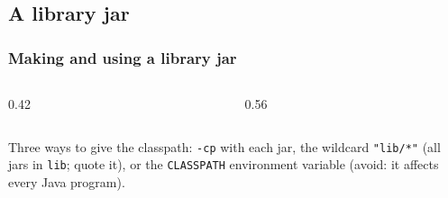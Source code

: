 \documentclass[aspectratio=169,10pt,compress]{beamer}
\begin{document}
\subsection[LibJar]{A library jar}




\begin{frame}[t,fragile] \frametitle{Making and using a library jar}
  \begin{columns}[T]
    \begin{column}{0.42\textwidth}
    \end{column}
    \begin{column}{0.56\textwidth}
    \end{column}
  \end{columns}

  \vspace{0.2em}
  \small Three ways to give the classpath: \texttt{-cp} with each jar, the wildcard \texttt{"lib/*"} (all jars in \texttt{lib};
  quote it), or the \texttt{CLASSPATH} environment variable (avoid: it affects every Java program).
\end{frame}
\end{document}
